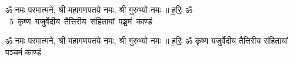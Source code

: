 \documentclass[17pt]{extarticle}
\begin{document}
\begin{titlepage}
    \begin{center}
 
\begin{sanskrit}
    { \Large
    ॐ नमः परमात्मने, श्री महागणपतये नमः, श्री गुरुभ्यो नमः ॥ ह॒रिः॒ ॐ 
    }
    \\
    \vspace{2.5cm}
    \mbox{ \Huge
    5       कृष्ण यजुर्वेदीय तैत्तिरीय संहितायां पञ्चमं काण्डं    }
\end{sanskrit}
\end{center}

\end{titlepage}
\tableofcontents

ॐ नमः परमात्मने, श्री महागणपतये नमः, श्री गुरुभ्यो नमः ॥ ह॒रिः॒ ॐ        कृष्ण यजुर्वेदीय तैत्तिरीय संहितायां पञ्चमं काण्डं  \newline
\end{document}
